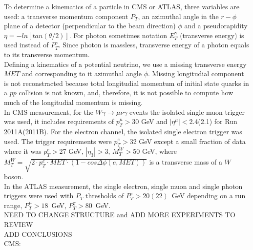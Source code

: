 To determine a kinematics of a particle in CMS or ATLAS, three variables are used: a transverse momentum component $P_T$, an azimuthal angle in the $r-\phi$ plane of a detector (perpendicular to the beam direction) $\phi$ and a pseudorapidity $\eta=-ln[tan(\theta/2)]$. For photon sometimes notation $E_T^\gamma$ (transverse energy) is used instead of $P_T^\gamma$. Since photon is massless, transverse energy of a photon equals to its transverse momentum.\\

Defining a kinematics of a potential neutrino, we use a missing transverse energy $MET$ and corresponding to it azimuthal angle $\phi$. Missing longitudial component is not reconstracted because total longitudial momentum of initial state quarks in a $pp$ collision is not known, and, therefore, it is not possible to compute how much of the longitudial momentum is missing.\\  

In CMS measurement, for the $W\gamma\rightarrow\mu\nu\gamma$ events the isolated single muon trigger was used, it includes requirements of $p_T^{\mu}>$30 GeV and $|\eta^{\mu}|<$2.4(2.1) for Run 2011A(2011B). For the electron channel, the isolated single electron trigger was used. The trigger requirements were $p_T^e>$32 GeV except a small fraction of data where it was $p_T^e>$27 GeV, $|\eta_3|>$3, $M_T^W>$50 GeV, where $M_T^W=\sqrt{2 \cdot p_T^e \cdot MET \cdot (1-cos\Delta\phi(e,MET))}$ is a transverse mass of a $W$ boson.\\

In the ATLAS measurement, the single electron, single muon and single photon triggers were used with $P_T$ thresholds of $P_T^e>20(22)$~GeV depending on a run range, $P_T^\mu>18$~GeV, $P_T^\gamma>80$~GeV.\\





NEED TO CHANGE STRUCTURE and ADD MORE EXPERIMENTS TO REVIEW\\

ADD CONCLUSIONS\\
 
CMS:\\

